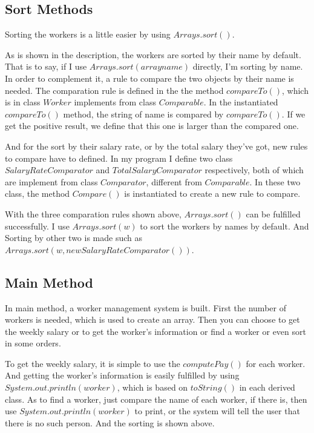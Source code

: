 \documentclass{article}
\begin{document}
\subsection{Sort Methods}
Sorting the workers is a little easier by using $Arrays.sort()$.

As is shown in the description, the workers are sorted by their name by default. That is to say, if I use $Arrays.sort(arrayname)$ directly, I'm sorting by name. In order to complement it, a rule to compare the two objects by their name is needed. The comparation rule is defined in the the method $compareTo()$, which is in class $Worker$ implements from class $Comparable$. In the instantiated $compareTo()$ method, the string of name is compared by $compareTo()$. If we get the positive result, we define that this one is larger than the compared one.

And for the sort by their salary rate, or by the total salary they've got, new rules to compare have to defined. In my program I define two class $SalaryRateComparator$ and $TotalSalaryComparator$ respectively, both of which are implement from class $Comparator$, different from $Comparable$. In these two class, the method $Compare()$ is instantiated to create a new rule to compare.

With the three comparation rules shown above, $Arrays.sort()$ can be fulfilled successfully. I use $Arrays.sort(w)$ to sort the workers by names by default. And Sorting by other two is made such as $Arrays.sort(w, new SalaryRateComparator())$.

\subsection{Main Method}
In main method, a worker management system is built. First the number of workers is needed, which is used to create an array. Then you can choose to get the weekly salary or to get the worker's information or find a worker or even sort in some  orders.

To get the weekly salary, it is simple to use the $computePay()$ for each worker. And getting the worker's information is easily fulfilled by using $System.out.println(worker)$, which is based on $toString()$ in each derived class. As to find a worker, just compare the name of each worker, if there is, then use $System.out.println(worker)$ to print, or the system will tell the user that there is no such person. And the sorting is shown above.
\end{document}
